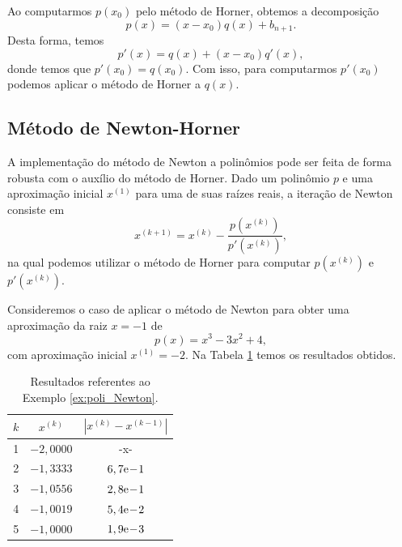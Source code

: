 \begin{obs}\label{obs:Horner_polider}
  Ao computarmos $p(x_0)$ pelo método de Horner, obtemos a decomposição
  \begin{equation}
    p(x) = (x-x_0)q(x) + b_{n+1}.
  \end{equation}
Desta forma, temos
\begin{equation}
  p'(x) = q(x) + (x-x_0)q'(x),
\end{equation}
donde temos que $p'(x_0) = q(x_0)$. Com isso, para computarmos $p'(x_0)$ podemos aplicar o método de Horner a $q(x)$.

% 
\end{obs}

\subsection{Método de Newton-Horner}
\badgeRevisar

A implementação do método de Newton a polinômios pode ser feita de forma robusta com o auxílio do método de Horner. Dado um polinômio $p$ e uma aproximação inicial $x^{(1)}$ para uma de suas raízes reais, a iteração de Newton consiste em
\begin{equation}
  x^{(k+1)} = x^{(k)} - \frac{p(x^{(k)})}{p'(x^{(k)})},
\end{equation}
na qual podemos utilizar o método de Horner para computar $p(x^{(k)})$ e $p'(x^{(k)})$.

\begin{ex}\label{ex:poli_Newton}
  Consideremos o caso de aplicar o método de Newton para obter uma aproximação da raiz $x=-1$ de
  \begin{equation}
    p(x) = x^3 - 3x^2 + 4,
  \end{equation}
  com aproximação inicial $x^{(1)} = -2$. Na Tabela \ref{tab:ex_poli_Newton} temos os resultados obtidos.

\begin{table}[h!]
  \centering
  \caption{Resultados referentes ao Exemplo \ref{ex:poli_Newton}.}
  \label{tab:ex_poli_Newton}
  \begin{tabular}{r|cc}
    $k$ & $x^{(k)}$ & $|x^{(k)}-x^{(k-1)}|$ \\\hline
    1 & $-2,0000$ & -x- \\
    2 & $-1,3333$ & $6,7\mathrm{e}\!-\!1$ \\
    3 & $-1,0556$ & $2,8\mathrm{e}\!-\!1$ \\
    4 & $-1,0019$ & $5,4\mathrm{e}\!-\!2$ \\
    5 & $-1,0000$ & $1,9\mathrm{e}\!-\!3$ \\\hline
  \end{tabular}
\end{table}

\end{ex}

